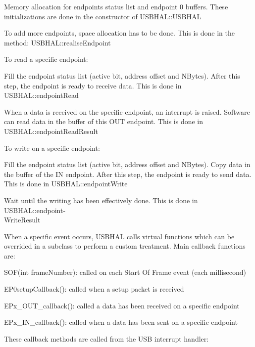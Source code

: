 \documentclass[pdftex,10pt,a4paper]{report}
\newenvironment{packed_item}{
\begin{itemize}
  \setlength{\itemsep}{1pt}
  \setlength{\parskip}{0pt}
  \setlength{\parsep}{0pt}
}{\end{itemize}}
\begin{document}
\begin{packed_item}
	\item Memory allocation for endpoints status list and endpoint 0 buffers. These initializations are done in the constructor of USBHAL::USBHAL
	\item To add more endpoints, space allocation has to be done. This is done in the method: USBHAL::realiseEndpoint
	\item To read a specific endpoint:
		\begin{packed_item}
			\item Fill the endpoint status list (active bit, address offset and NBytes). After this step, the endpoint is ready to receive data. This is done in USBHAL::endpointRead
			\item When a data is received on the specific endpoint, an interrupt is raised. Software can read data in the buffer of this OUT endpoint. This is done in USBHAL::endpointReadResult
		\end{packed_item}
	\item To write on a specific endpoint:
		\begin{packed_item}
			\item Fill the endpoint status list (active bit, address offset and NBytes). Copy data in the buffer of the IN endpoint. After this step, the endpoint is ready to send data. This is done in USBHAL::endpointWrite
			\item Wait until the writing has been effectively done. This is done in USBHAL::endpoint-\\WriteResult
		\end{packed_item}
\end{packed_item}


When a specific event occurs, USBHAL calls virtual functions which can be overrided in a subclass to perform a custom treatment. Main callback functions are:
\begin{packed_item}
	\item SOF(int frameNumber): called on each Start Of Frame event (each millisecond)
	\item EP0setupCallback(): called when a setup packet is received
	\item EPx\_OUT\_callback(): called a data has been received on a specific endpoint
	\item EPx\_IN\_callback(): called when a data has been sent on a specific endpoint
\end{packed_item}

These callback methods are called from the USB interrupt handler:
\end{document}
